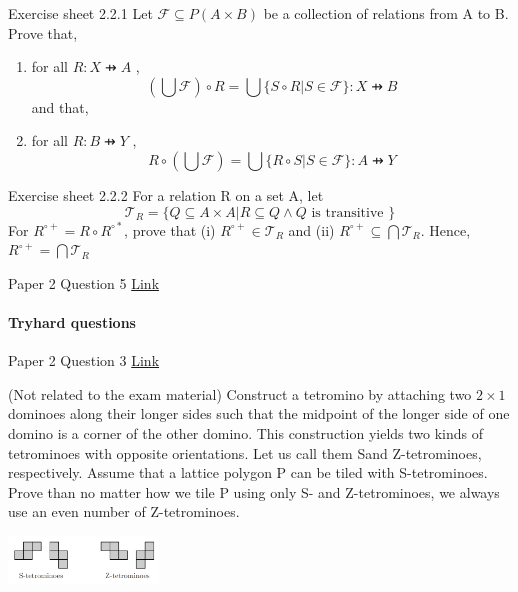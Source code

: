 \documentclass{exam}
\begin{document}
\begin{questions}
\question Exercise sheet 2.2.1 Let $\mathcal{F} \subseteq P(A \times B)$ be a collection of relations from A to B. Prove that,
\begin{enumerate}[label=(\alph*)]
\item for all $R : X \pfun A$ ,
$$(\bigcup \mathcal{F}) \circ R = \bigcup \{S \circ R | S \in \mathcal{ F} \} : X \pfun B	$$
and that,
\item for all $R : B \pfun Y$ ,
$$R \circ (\bigcup \mathcal{F}) = \bigcup \{R \circ S | S \in \mathcal{ F} \} : A \pfun Y	$$
\end{enumerate}

\question Exercise sheet 2.2.2 For a relation R on a set A, let 
$$\mathcal{T}_R = \{Q \subseteq A \times A | R \subseteq Q \wedge Q \text{ is transitive }\}$$ 	
For $R^{\circ+} = R \circ R^{\circ*}$, prove that (i) $R^{\circ+} \in \mathcal{T}_R$ and (ii) $R^{\circ+} \subseteq \bigcap \mathcal{T}_R$. Hence, $R^{\circ+} = \bigcap \mathcal{T}_R$

 Paper 2 Question 5 \href{http://www.cl.cam.ac.uk/teaching/exams/pastpapers/y2007p2q5.pdf}{Link} 

\end{questions}

\paragraph{Tryhard questions}
\begin{questions}
 Paper 2 Question 3 \href{http://www.cl.cam.ac.uk/teaching/exams/pastpapers/y2008p2q3.pdf}{Link} 

\question (Not related to the exam material) Construct a tetromino by attaching two $2\times  1$ dominoes along their longer sides such
that the midpoint of the longer side of one domino is a corner of the other domino. This
construction yields two kinds of tetrominoes with opposite orientations. Let us call them Sand Z-tetrominoes, respectively.
Assume that a lattice polygon P can be tiled with S-tetrominoes. Prove than no matter
how we tile P using only S- and Z-tetrominoes, we always use an even number of Z-tetrominoes.

\includegraphics[width=0.3\textwidth]{tetrominos.png}

\end{questions}
\end{document}

